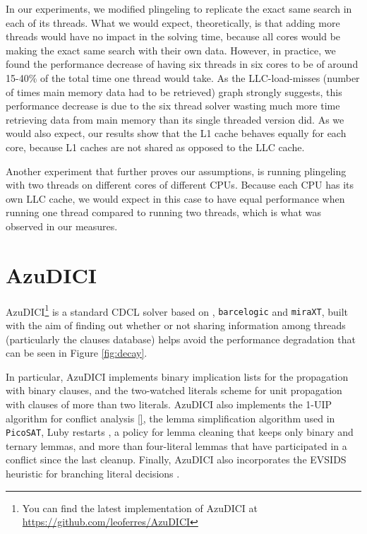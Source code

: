 \documentclass{llncs}
\begin{document}

In our experiments, we modified plingeling to replicate the exact same
search in each of its threads. What we would expect, theoretically, is
that adding more threads would have no impact in the solving time,
because all cores would be making the exact same search with their own
data. However, in practice, we found the performance decrease of
having six threads in six cores to be of around 15-40\% of the total
time one thread would take. As the LLC-load-misses (number of times
main memory data had to be retrieved) graph strongly suggests, this
performance decrease is due to the six thread solver wasting much more
time retrieving data from main memory than its single threaded version
did. As we would also expect, our results show that the L1 cache
behaves equally for each core, because L1 caches are not shared as
opposed to the LLC cache.

Another experiment that further proves our assumptions, is running
plingeling with two threads on different cores of different
CPUs. Because each CPU has its own LLC cache, we would expect in this
case to have equal performance when running one thread compared to
running two threads, which is what was observed in our measures.

\section{AzuDICI}
\label{sec:azudici}

AzuDICI\footnote{You can find the latest implementation of AzuDICI at
  \url{https://github.com/leoferres/AzuDICI}} is a standard CDCL
solver based on \pling, {\tt barcelogic} and {\tt miraXT}, built with
the aim of finding out whether or not sharing information among
threads (particularly the clauses database) helps avoid the
performance degradation that can be seen in Figure \ref{fig:decay}.

In particular, AzuDICI implements binary implication lists for the
propagation with binary clauses, and the two-watched literals scheme
for unit propagation \cite{} with clauses of more than two
literals. AzuDICI also implements the 1-UIP algorithm for conflict
analysis \ref{}, the lemma simplification algorithm used in {\tt
  PicoSAT}, Luby restarts \cite{}, a policy for lemma cleaning that
keeps only binary and ternary lemmas, and more than four-literal
lemmas that have participated in a conflict since the last
cleanup. Finally, AzuDICI also incorporates the EVSIDS heuristic for
branching literal decisions \cite{}.
\end{document}

